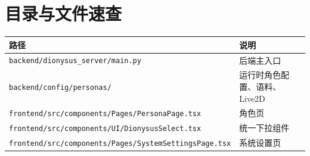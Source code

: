 \documentclass[12pt,a4paper]{article}
\begin{document}
\section{目录与文件速查}

\begin{center}
\begin{tabular}{ll}
\toprule
\textbf{路径} & \textbf{说明} \\
\midrule
\texttt{backend/dionysus\_server/main.py} & 后端主入口 \\
\texttt{backend/config/personas/} & 运行时角色配置、语料、Live2D \\
\texttt{frontend/src/components/Pages/PersonaPage.tsx} & 角色页 \\
\texttt{frontend/src/components/UI/DionysusSelect.tsx} & 统一下拉组件 \\
\texttt{frontend/src/components/Pages/SystemSettingsPage.tsx} & 系统设置页 \\
\bottomrule
\end{tabular}
\end{center}
\end{document}
